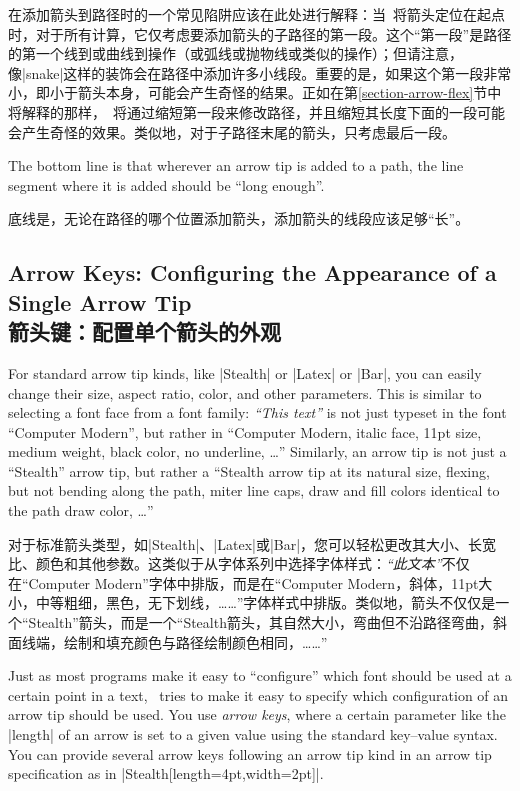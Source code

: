 在添加箭头到路径时的一个常见陷阱应该在此处进行解释：当\tikzname\ 将箭头定位在起点时，对于所有计算，它仅考虑要添加箭头的子路径的第一段。这个“第一段”是路径的第一个线到或曲线到操作（或弧线或抛物线或类似的操作）；但请注意，像|snake|这样的装饰会在路径中添加许多小线段。重要的是，如果这个第一段非常小，即小于箭头本身，可能会产生奇怪的结果。正如在第\ref{section-arrow-flex}节中将解释的那样，\tikzname\ 将通过缩短第一段来修改路径，并且缩短其长度下面的一段可能会产生奇怪的效果。类似地，对于子路径末尾的箭头，只考虑最后一段。

The bottom line is that wherever an arrow tip is added to a path, the line
segment where it is added should be ``long enough''.

底线是，无论在路径的哪个位置添加箭头，添加箭头的线段应该足够“长”。


\subsection{Arrow Keys: Configuring the Appearance of a Single Arrow Tip\\箭头键：配置单个箭头的外观}
\label{section-arrow-config}

For standard arrow tip kinds, like |Stealth| or |Latex| or |Bar|, you can
easily change their size, aspect ratio, color, and other parameters. This is
similar to selecting a font face from a font family: \emph{``This text''} is
not just typeset in the font ``Computer Modern'', but rather in ``Computer
Modern, italic face, 11pt size, medium weight, black color, no underline,
\dots'' Similarly, an arrow tip is not just a ``Stealth'' arrow tip, but rather
a ``Stealth arrow tip at its natural size, flexing, but not bending along the
path, miter line caps, draw and fill colors identical to the path draw color,
\dots''

对于标准箭头类型，如|Stealth|、|Latex|或|Bar|，您可以轻松更改其大小、长宽比、颜色和其他参数。这类似于从字体系列中选择字体样式：\emph{“此文本”}不仅在“Computer Modern”字体中排版，而是在“Computer Modern，斜体，11pt大小，中等粗细，黑色，无下划线，……”字体样式中排版。类似地，箭头不仅仅是一个“Stealth”箭头，而是一个“Stealth箭头，其自然大小，弯曲但不沿路径弯曲，斜面线端，绘制和填充颜色与路径绘制颜色相同，……”

Just as most programs make it easy to ``configure'' which font should be used
at a certain point in a text, \tikzname\ tries to make it easy to specify which
configuration of an arrow tip should be used. You use \emph{arrow keys}, where
a certain parameter like the |length| of an arrow is set to a given value using
the standard key--value syntax. You can provide several arrow keys following an
arrow tip kind in  an arrow tip specification as in
|Stealth[length=4pt,width=2pt]|.

